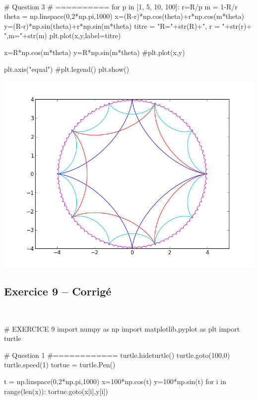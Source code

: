 \documentclass[10pt,fleqn]{article} %
\begin{document}
\begin{corrige}
$\quad$
\begin{python}
# Question 3
# ==========
for p in [1, 5, 10, 100]:
    r=R/p
    m = 1-R/r
    theta = np.linspace(0,2*np.pi,1000)
    x=(R-r)*np.cos(theta)+r*np.cos(m*theta)
    y=(R-r)*np.sin(theta)+r*np.sin(m*theta)
    titre = "R="+str(R)+", r = "+str(r)+ ",m="+str(m)
    plt.plot(x,y,label=titre)

x=R*np.cos(m*theta)
y=R*np.sin(m*theta)
#plt.plot(x,y)

plt.axis("equal")
#plt.legend()
plt.show()
\end{python}
\end{corrige}

\begin{center}
\includegraphics[width=.4\linewidth]{images/exo_FB_07_2}
\end{center}




{}
\subsection*{Exercice 9 -- Corrigé}

\begin{corrige}
$\quad$
\begin{python}
# EXERCICE 9
import numpy as np
import matplotlib.pyplot as plt
import turtle

# Question 1 
#============
turtle.hideturtle()
turtle.goto(100,0)
turtle.speed(1)
tortue = turtle.Pen()

t = np.linspace(0,2*np.pi,1000)
x=100*np.cos(t)
y=100*np.sin(t)
for i in range(len(x)):
    tortue.goto(x[i],y[i])
\end{python}
\end{corrige}
\end{document}
